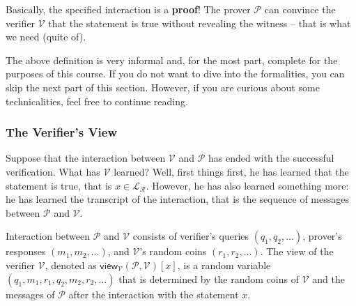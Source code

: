 \documentclass[../lecture-notes.tex]{subfiles}
\begin{document}
Basically, the specified interaction is a \textbf{proof}! The prover $\mathcal{P}$ can convince the verifier $\mathcal{V}$ that the statement is true without revealing the witness -- that is what we need (quite of).

\begin{remark}
    The above definition is very informal and, for the most part, complete for the purposes of this course. If you do not want to dive into the formalities, you can skip the next part of this section. However, if you are curious about some technicalities, feel free to continue reading.
\end{remark}

\subsubsection{The Verifier's View}
Suppose that the interaction between $\mathcal{V}$ and $\mathcal{P}$ has ended with the successful verification. What has $\mathcal{V}$ learned? Well, first things first, he has learned that the statement is true, that is $x \in \mathcal{L}_{\mathcal{R}}$. However, he has also learned something more: he has learned the transcript of the interaction, that is the sequence of messages between $\mathcal{P}$ and $\mathcal{V}$.

\begin{definition}
    Interaction between $\mathcal{P}$ and $\mathcal{V}$ consists of verifier's queries $(q_1,q_2,\dots)$, prover's responses $(m_1,m_2,\dots)$, and $\mathcal{V}$'s random coins $(r_1,r_2,\dots)$. The view of the verifier $\mathcal{V}$, denoted as $\mathsf{view}_{\mathcal{V}}(\mathcal{P},\mathcal{V})[x]$, is a random variable $(q_1,m_1,r_1,q_2,m_2,r_2,\dots)$ that is determined by the random coins of $\mathcal{V}$ and the messages of $\mathcal{P}$ after the interaction with the statement $x$.
\end{definition}
\end{document}
